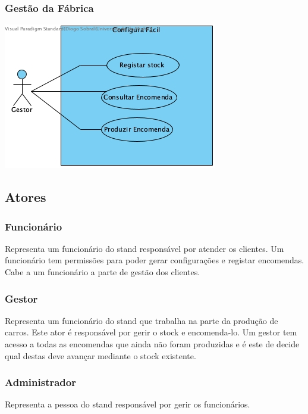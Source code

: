 \subsubsection{Gestão da Fábrica}
		\begin{center}
 			\includegraphics[scale = 0.7]{D_USECASE/Gestao_da_fabrica.jpg}
		\end{center}
\subsection{Atores}
\subsubsection{Funcionário}
Representa um funcionário do stand responsável por atender os clientes. Um funcionário tem permissões para poder gerar configurações e registar encomendas. Cabe a um funcionário a parte de gestão dos clientes.

\subsubsection{Gestor}
Representa um funcionário do stand que trabalha na parte da produção de carros. Este ator é responsável por gerir o stock e encomenda-lo. Um gestor tem acesso a todas as encomendas que ainda não foram produzidas e é este de decide qual destas deve avançar mediante o stock existente.

\subsubsection{Administrador}
Representa a pessoa do stand responsável por gerir os funcionários.

\newpage